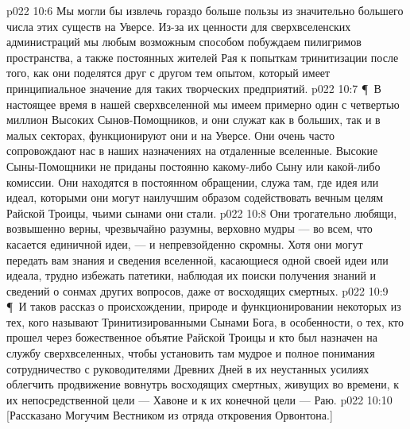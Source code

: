 \vs p022 10:6 Мы могли бы извлечь гораздо больше пользы из значительно большего числа этих существ на Уверсе. Из\hyp{}за их ценности для сверхвселенских администраций мы любым возможным способом побуждаем пилигримов пространства, а также постоянных жителей Рая к попыткам тринитизации после того, как они поделятся друг с другом тем опытом, который имеет принципиальное значение для таких творческих предприятий.
\vs p022 10:7 \P\ В настоящее время в нашей сверхвселенной мы имеем примерно один с четвертью миллион Высоких Сынов\hyp{}Помощников, и они служат как в больших, так и в малых секторах, функционируют они и на Уверсе. Они очень часто сопровождают нас в наших назначениях на отдаленные вселенные. Высокие Сыны\hyp{}Помощники не приданы постоянно какому\hyp{}либо Сыну или какой\hyp{}либо комиссии. Они находятся в постоянном обращении, служа там, где идея или идеал, которыми они  могут наилучшим образом содействовать вечным целям Райской Троицы, чьими сынами они стали.
\vs p022 10:8 Они трогательно любящи, возвышенно верны, чрезвычайно разумны, верховно мудры --- во всем, что касается единичной идеи, --- и непревзойденно скромны. Хотя они могут передать вам знания и сведения вселенной, касающиеся одной своей идеи или идеала, трудно избежать патетики, наблюдая их поиски получения знаний и сведений о сонмах других вопросов, даже от восходящих смертных.
\vs p022 10:9 \P\ И таков рассказ о происхождении, природе и функционировании некоторых из тех, кого называют Тринитизированными Сынами Бога, в особенности, о тех, кто прошел через божественное объятие Райской Троицы и кто был назначен на службу сверхвселенных, чтобы установить там мудрое и полное понимания сотрудничество с руководителями Древних Дней в их неустанных усилиях облегчить продвижение вовнутрь восходящих смертных, живущих во времени, к их непосредственной цели --- Хавоне и к их конечной цели --- Раю.
\vs p022 10:10 [Рассказано Могучим Вестником из отряда откровения Орвонтона.]
